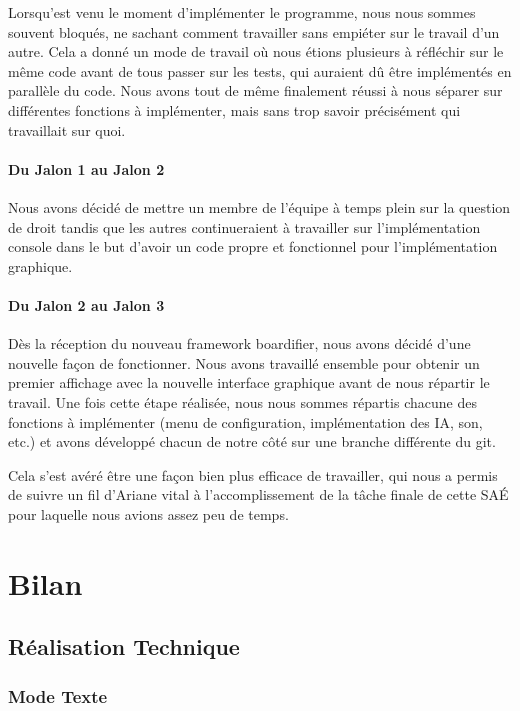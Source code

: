 Lorsqu'est venu le moment d'implémenter le programme, nous nous sommes souvent bloqués, ne sachant comment travailler sans empiéter sur le travail d'un autre.
Cela a donné un mode de travail où nous étions plusieurs à réfléchir sur le même code avant de tous passer sur les tests, qui auraient dû être implémentés en parallèle du code.
Nous avons tout de même finalement réussi à nous séparer sur différentes fonctions à implémenter, mais sans trop savoir précisément qui travaillait sur quoi.

\subsubsection{Du Jalon 1 au Jalon 2}

Nous avons décidé de mettre un membre de l'équipe à temps plein sur la question de droit tandis que les autres continueraient à travailler sur l'implémentation console dans le but d'avoir un code propre et fonctionnel pour l'implémentation graphique.

\subsubsection{Du Jalon 2 au Jalon 3}

Dès la réception du nouveau framework boardifier, nous avons décidé d'une nouvelle façon de fonctionner.
Nous avons travaillé ensemble pour obtenir un premier affichage avec la nouvelle interface graphique avant de nous répartir le travail.
Une fois cette étape réalisée, nous nous sommes répartis chacune des fonctions à implémenter (menu de configuration, implémentation des IA, son, etc.) et avons développé chacun de notre côté sur une branche différente du git.

Cela s'est avéré être une façon bien plus efficace de travailler, qui nous a permis de suivre un fil d'Ariane vital à l'accomplissement de la tâche finale de cette SAÉ pour laquelle nous avions assez peu de temps.


\chapter{Bilan}

\section{Réalisation Technique}

\subsection*{Mode Texte}

